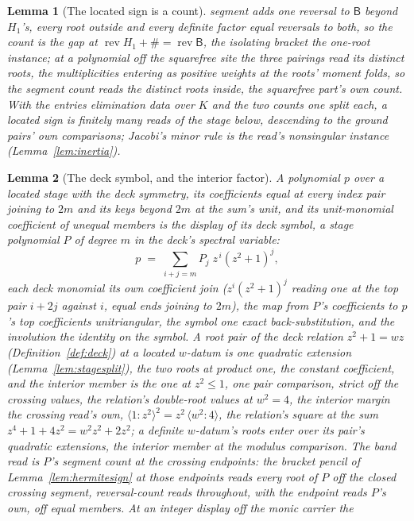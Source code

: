 \documentclass[11pt]{article}
\newtheorem{lemma}{Lemma}
\theoremstyle{definition}
\begin{document}
\begin{lemma}[The located sign is a count]
segment adds one reversal to $\mathsf B$ beyond $H_1$'s, every root
outside and every definite factor equal reversals to both, so the
count is the gap at $\operatorname{rev}H_1+\#=\operatorname{rev}
\mathsf B$, the isolating bracket the one-root instance; at a
polynomial off the squarefree site the three pairings read its
distinct roots, the multiplicities entering as positive weights at
the roots' moment folds, so the segment count reads the distinct
roots inside, the squarefree part's own count. With the
entries
elimination data over $K$ and the two counts one split each, a
located sign is finitely many reads of the stage below, descending
to the ground pairs' own comparisons; Jacobi's minor rule is the
read's nonsingular instance (Lemma~\ref{lem:inertia}).
\end{lemma}

\begin{lemma}[The deck symbol, and the interior factor]\label{lem:deckfactor}
A polynomial $p$ over a located stage with the \emph{deck
symmetry}, its coefficients equal at every index pair joining to
$2m$ and its keys beyond $2m$ at the sum's unit, and its
unit-monomial coefficient of unequal
members is the display of its \emph{deck symbol}, a stage polynomial
$P$ of degree $m$ in the deck's spectral variable:
\[
p\;=\;\sum_{i+j=m}P_j\;z^{\,i}(z^2+1)^j ,
\]
each deck monomial its own coefficient join ($z^i(z^2+1)^j$ reading
one at the top pair $i+2j$ against $i$, equal ends joining to $2m$),
the map from $P$'s
coefficients to $p$'s top coefficients unitriangular, the symbol one
exact back-substitution, and the involution the identity on the
symbol. A root pair of the deck relation $z^2+1=wz$
(Definition~\ref{def:deck}) at a located
$w$-datum is one quadratic extension (Lemma~\ref{lem:stagesplit}), the two
roots at product one, the constant coefficient, and the
\emph{interior member} is the one at $z^2\le1$, one pair
comparison, strict off the crossing values, the relation's
double-root values at $w^2=4$, the interior margin the crossing
read's own,
$\langle1\!:\!z^2\rangle^2=z^2\,\langle w^2\!:\!4\rangle$, the
relation's square at the sum $z^4+1+4z^2=w^2z^2+2z^2$; a definite $w$-datum's
roots enter over its pair's quadratic extensions, the interior member at
the modulus comparison. The \emph{band read} is $P$'s segment count
at the crossing endpoints: the
bracket pencil of Lemma~\ref{lem:hermitesign} at those endpoints
reads every root of $P$ off the closed crossing segment,
reversal-count reads throughout, with the endpoint reads $P$'s own,
off equal members. At an integer display off the monic carrier the

\end{lemma}
\end{document}
